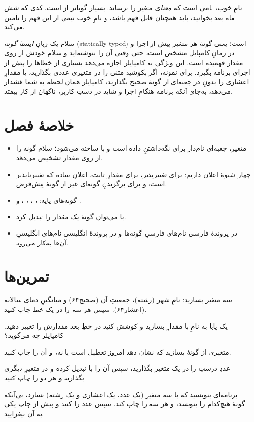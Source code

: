 \begin{tip}
نامِ خوب، نامی است که \emph{معنا}ی متغیر را برساند.  بسیار
گویاتر از  است. کدی که شش ماه بعد بخوانید، باید همچنان قابلِ فهم باشد،
و نامِ خوب نیمی از این فهم را تأمین می‌کند.
\end{tip}

\begin{deep}
سلام یک زبانِ \emph{ایستا-گونه} (statically typed) است؛ یعنی گونهٔ هر متغیر پیش
از اجرا و در زمانِ کامپایل مشخص است، حتی وقتی آن را ننوشته‌اید و سلام خودش از
روی مقدار فهمیده است. این ویژگی به کامپایلر اجازه می‌دهد بسیاری از خطاها را
\emph{پیش} از اجرای برنامه بگیرد. برای نمونه، اگر بکوشید متنی را در متغیری عددی
بگذارید، یا مقدارِ اعشاری را بدونِ  در جعبه‌ای از گونهٔ صحیح بگذارید،
کامپایلر همان لحظه به شما هشدار می‌دهد، به‌جای آنکه برنامه هنگامِ اجرا و
شاید در دستِ کاربر، ناگهان از کار بیفتد.
\end{deep}

\section{خلاصهٔ فصل}

\begin{itemize}
  \item متغیر، جعبه‌ای نام‌دار برای نگه‌داشتنِ داده است و با \code{:=} ساخته
        می‌شود؛ سلام گونه را از روی مقدار تشخیص می‌دهد.
  \item چهار شیوهٔ اعلان داریم:  برای تغییرپذیر، 
        برای مقدارِ ثابت، اعلانِ ساده که تغییرناپذیر است، و
         برای برگزیدنِ گونه‌ای غیر از گونهٔ پیش‌فرض.
  \item گونه‌های پایه: ، ، ،
        ،  و .
  \item با  می‌توان گونهٔ یک مقدار را تبدیل کرد.
  \item در پروندهٔ فارسی نام‌های فارسیِ گونه‌ها و در پروندهٔ انگلیسی نام‌های
        انگلیسیِ آن‌ها به‌کار می‌رود.
\end{itemize}

\section{تمرین‌ها}

\exercise سه متغیر بسازید: نامِ شهر (رشته)، جمعیتِ آن (صحیح۶۴) و میانگینِ دمای
سالانه (اعشار۶۴). سپس هر سه را در یک خط چاپ کنید.

\exercise یک پایا به نامِ  با مقدارِ  بسازید و کوشش کنید
در خطِ بعد مقدارش را تغییر دهید. کامپایلر چه می‌گوید؟

\exercise متغیری از گونهٔ  بسازید که نشان دهد امروز تعطیل است یا
نه، و آن را چاپ کنید.

\exercise عددِ درستِ  را در یک متغیر بگذارید، سپس آن را با
 تبدیل کرده و در متغیرِ دیگری بگذارید و هر دو را چاپ کنید.

\exercise برنامه‌ای بنویسید که با \code{:=} سه متغیر (یک عدد، یک اعشاری و یک
رشته) بسازد، بی‌آنکه گونهٔ هیچ‌کدام را بنویسد، و هر سه را چاپ کند. سپس عدد را
 کنید و پیش از چاپ یکی به آن بیفزایید.
